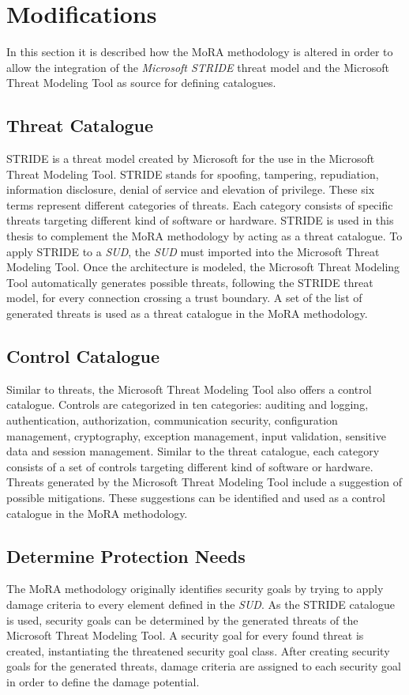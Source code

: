 \section{Modifications}
\label{moramodification}
In this section it is described how the MoRA methodology is altered in order to allow the integration of the \textit{Microsoft STRIDE} threat model and the Microsoft Threat Modeling Tool as source for defining catalogues.

\subsection{Threat Catalogue}
STRIDE is a threat model created by Microsoft for the use in the Microsoft Threat Modeling Tool. STRIDE stands for spoofing, tampering, repudiation, information disclosure, denial of service and elevation of privilege. These six terms represent different categories of threats. Each category consists of specific threats targeting different kind of software or hardware. STRIDE is used in this thesis to complement the MoRA methodology by acting as a threat catalogue. To apply STRIDE to a \textit{SUD}, the \textit{SUD} must imported into the Microsoft Threat Modeling Tool. Once the architecture is modeled, the Microsoft Threat Modeling Tool automatically generates possible threats, following the STRIDE threat model, for every connection crossing a trust boundary. A set of the list of generated threats is used as a threat catalogue in the MoRA methodology.



\subsection{Control Catalogue}

Similar to threats, the Microsoft Threat Modeling Tool also offers a control catalogue. Controls are categorized in ten categories\cite{mtmtmitigations}: auditing and logging, authentication, authorization, communication security, configuration management, cryptography, exception management, input validation, sensitive data and session management. Similar to the threat catalogue, each category consists of a set of controls targeting different kind of software or hardware. Threats generated by the Microsoft Threat Modeling Tool include a suggestion of possible mitigations. These suggestions can be identified and used as a control catalogue in the MoRA methodology.

\subsection{Determine Protection Needs}
\label{altereddetprotneeds}
The MoRA methodology originally identifies security goals by trying to apply damage criteria to every element defined in the \textit{SUD}. As the STRIDE catalogue is used, security goals can be determined by the generated threats of the Microsoft Threat Modeling Tool. A security goal for every found threat is created, instantiating the threatened security goal class. After creating security goals for the generated threats, damage criteria are assigned to each security goal in order to define the damage potential.

